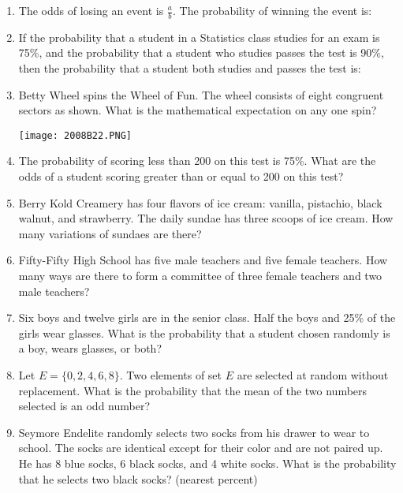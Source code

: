 \documentclass[../uilmath.tex]{subfiles}
\begin{document}
\begin{enumerate}[label=\bfseries\arabic*.]
    \item %
    The odds of losing an event is $\frac{a}{b}$. The probability of winning the event is:

    \item %
    If the probability that a student in a Statistics class studies for an exam is 75\%, and the probability that a student who 
    studies passes the test is 90\%, then the probability that a student both studies and passes the test is: 

    \item %
    Betty Wheel spins the Wheel of Fun. The wheel consists of eight congruent sectors as shown. What is the mathematical expectation on any one spin?
    \begin{center}
        \texttt{[image: 2008B22.PNG]}
    \end{center}

    \item %
    The probability of scoring less than 200 on this test is 75\%. What are the odds of a student scoring greater than or equal to 200 on this test?

    \item %
    Berry Kold Creamery has four flavors of ice cream: vanilla, pistachio, black walnut, and strawberry. The daily sundae has three scoops of ice cream. How many variations of sundaes are there?

    \item %
    Fifty-Fifty High School has five male teachers and five female teachers. How many ways are there to form a committee of three female teachers and two male teachers?

    \item %
    Six boys and twelve girls are in the senior class. Half the boys and 25\% of the girls wear glasses. What is the probability that a student chosen randomly is a boy, wears glasses, or both?

    \item %
    Let $E=\{0,2,4,6,8\}$. Two elements of set $E$ are selected at random without replacement.
    What is the probability that the mean of the two numbers selected is an odd number?

    \item %
    Seymore Endelite randomly selects two socks from his drawer to wear to school. The socks are identical except for their color 
    and are not paired up. He has 8 blue socks, 6 black socks, and 4 white socks. What is the probability that he selects two black socks? (nearest percent)


\end{enumerate}
\end{document}
